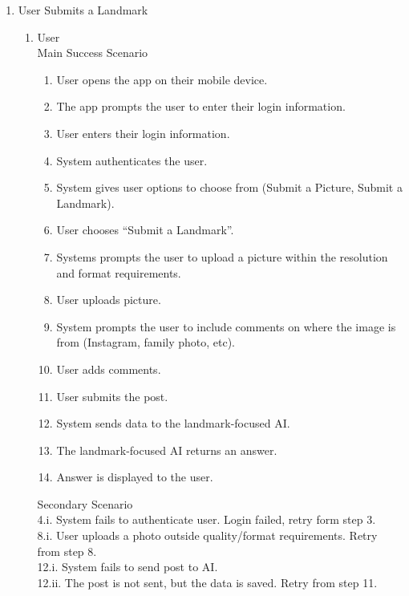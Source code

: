 \documentclass[]{article}
\begin{document}
\begin{enumerate}[{\bf BE1.}]
		\item User Submits a Landmark
		\begin{enumerate}[{\bf VP1.}]
		\item User \\
		Main Success Scenario
                    \begin{enumerate}[{1.}]
                        \item User opens the app on their mobile device.
                        \item The app prompts the user to enter their login information.
                        \item User enters their login information.
                        \item System authenticates the user. 
                        \item System gives user options to choose from (Submit a Picture, Submit a Landmark). 
                        \item User chooses “Submit a Landmark”. 
                        \item Systems prompts the user to upload a picture within the resolution and format requirements.
                        \item User uploads picture.
                        \item System prompts the user to include comments on where the image is from (Instagram, family photo, etc). 
                        \item User adds comments.
                        \item User submits the post.
                        \item System sends data to the landmark-focused AI. 
                        \item The landmark-focused AI returns an answer. 
                        \item Answer is displayed to the user. \\
                    \end{enumerate}
                    Secondary Scenario \\
                    4.i. System fails to authenticate user. Login failed, retry form step 3. \\
                    8.i. User uploads a photo outside quality/format requirements. Retry from step 8.\\ 
                    12.i. System fails to send post to AI. \\
                    12.ii. The post is not sent, but the data is saved. Retry from step 11. \\

\end{enumerate}
\end{enumerate}
\end{document}
